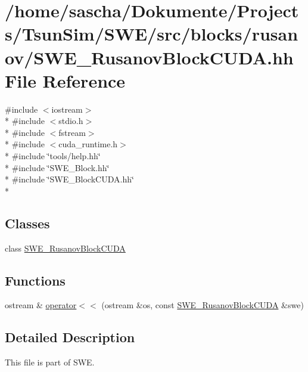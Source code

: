 \hypertarget{SWE__RusanovBlockCUDA_8hh}{\section{/home/sascha/\-Dokumente/\-Projects/\-Tsun\-Sim/\-S\-W\-E/src/blocks/rusanov/\-S\-W\-E\-\_\-\-Rusanov\-Block\-C\-U\-D\-A.hh File Reference}
\label{SWE__RusanovBlockCUDA_8hh}
}
{\ttfamily \#include $<$iostream$>$}\\*
{\ttfamily \#include $<$stdio.\-h$>$}\\*
{\ttfamily \#include $<$fstream$>$}\\*
{\ttfamily \#include $<$cuda\-\_\-runtime.\-h$>$}\\*
{\ttfamily \#include \char`\"{}tools/help.\-hh\char`\"{}}\\*
{\ttfamily \#include \char`\"{}S\-W\-E\-\_\-\-Block.\-hh\char`\"{}}\\*
{\ttfamily \#include \char`\"{}S\-W\-E\-\_\-\-Block\-C\-U\-D\-A.\-hh\char`\"{}}\\*
\subsection*{Classes}
\begin{DoxyCompactItemize}
\item 
class \hyperlink{classSWE__RusanovBlockCUDA}{S\-W\-E\-\_\-\-Rusanov\-Block\-C\-U\-D\-A}
\end{DoxyCompactItemize}
\subsection*{Functions}
\begin{DoxyCompactItemize}
\item 
ostream \& \hyperlink{SWE__RusanovBlockCUDA_8hh_adbdcb6417643b695657724ea16f84954}{operator$<$$<$} (ostream \&os, const \hyperlink{classSWE__RusanovBlockCUDA}{S\-W\-E\-\_\-\-Rusanov\-Block\-C\-U\-D\-A} \&swe)
\end{DoxyCompactItemize}


\subsection{Detailed Description}
This file is part of S\-W\-E.

